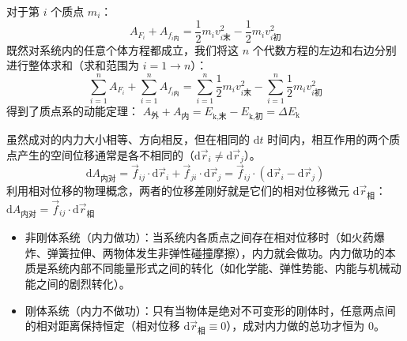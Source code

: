 \begin{theorem}[质点系动能定理]
对于第 $i$ 个质点 $m_i$：$$A_{F_i} + A_{f_{i\text{内}}} = \frac{1}{2}m_iv_{i\text{末}}^2 - \frac{1}{2}m_iv_{i\text{初}}^2$$既然对系统内的任意个体方程都成立，我们将这 $n$ 个代数方程的左边和右边分别进行整体求和（求和范围为 $i=1 \to n$）：$$\sum_{i=1}^{n} A_{F_i} + \sum_{i=1}^{n} A_{f_{i\text{内}}} = \sum_{i=1}^{n} \frac{1}{2}m_iv_{i\text{末}}^2 - \sum_{i=1}^{n} \frac{1}{2}m_iv_{i\text{初}}^2$$得到了质点系的动能定理： \(A_{\text{外}} + A_{\text{内}} = E_{\text{k,末}} - E_{\text{k,初}} = \Delta E_{\text{k}}\) 
\end{theorem}
\begin{note}
虽然成对的内力大小相等、方向相反，但在相同的 $\mathrm{d}t$ 时间内，相互作用的两个质点产生的空间位移通常是各不相同的（$\mathrm{d}\vec{r}_i \neq \mathrm{d}\vec{r}_j$）。$$\mathrm{d}A_{\text{内对}} = \vec{f}_{ij} \cdot \mathrm{d}\vec{r}_i + \vec{f}_{ji} \cdot \mathrm{d}\vec{r}_j = \vec{f}_{ij} \cdot (\mathrm{d}\vec{r}_i - \mathrm{d}\vec{r}_j)$$利用相对位移的物理概念，两者的位移差刚好就是它们的相对位移微元 $\mathrm{d}\vec{r}_{\text{相}}$： \(\mathrm{d}A_{\text{内对}} = \vec{f}_{ij} \cdot \mathrm{d}\vec{r}_{\text{相}}\) 
\begin{itemize}
\item 非刚体系统（内力做功）：当系统内各质点之间存在相对位移时（如火药爆炸、弹簧拉伸、两物体发生非弹性碰撞摩擦），内力就会做功。内力做功的本质是系统内部不同能量形式之间的转化（如化学能、弹性势能、内能与机械动能之间的剧烈转化）。
\item 刚体系统（内力不做功）：只有当物体是绝对不可变形的刚体时，任意两点间的相对距离保持恒定（相对位移 $\mathrm{d}\vec{r}_{\text{相}} \equiv 0$），成对内力做的总功才恒为 0。
\end{itemize}
\end{note}
